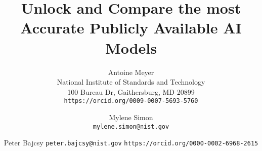 \documentclass[10pt,twocolumn,letterpaper]{article}
\title{Unlock and Compare the most Accurate Publicly Available AI Models}
\author{Antoine Meyer\\
National Institute of Standards and Technology\\
100 Bureau Dr, Gaithersburg, MD 20899\\
{\tt\small https://orcid.org/0009-0007-5693-5760}
\and
Mylene Simon\\
{\tt\small mylene.simon@nist.gov}
\and
Peter Bajcsy
{\tt\small peter.bajcsy@nist.gov}
{\tt\small https://orcid.org/0000-0002-6968-2615}
}
\begin{document}
\maketitle








{
    \small
    
    
}
\printglossaries

% 
\end{document}

